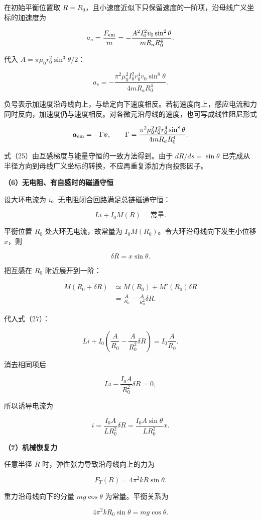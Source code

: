 \documentclass[12pt,a4paper,UTF8]{ctexart}
\begin{document}
在初始平衡位置取
\(R=R_0\)，且小速度近似下只保留速度的一阶项，沿母线广义坐标的加速度为

\[a_s=\frac{F_{\rm em}}m
=-\frac{A^2I_0^2v_0\sin^2\theta}{mR_aR_0^4}.\]

代入 \(A=\pi\mu_0r_0^2\sin^3\theta/2\)：

\[\boxed{
a_s=-\frac{\pi^2\mu_0^2I_0^2r_0^4v_0\sin^8\theta}
{4mR_aR_0^4}}.\]

负号表示加速度沿母线向上，与给定向下速度相反。若初速度向上，感应电流和力同时反向，加速度仍与速度相反。对各微元沿母线的速度，也可写成线性阻尼形式

\[\bm a_{\rm em}=-\Gamma\bm v,
\qquad
\Gamma=\frac{\pi^2\mu_0^2I_0^2r_0^4\sin^8\theta}
{4mR_aR_0^4}.\]

式（25）由互感梯度与能量守恒的一致方法得到。由于 \(dR/ds=\sin\theta\)
已完成从半径方向到母线广义坐标的转换，不应再重复添加方向投影因子。

\textbf{（6）无电阻、有自感时的磁通守恒}

设大环电流为 \(i\)。无电阻闭合回路满足总链磁通守恒：

\[Li+I_0M(R)=\text{常量}.\]

平衡位置 \(R_0\) 处大环无电流，故常量为
\(I_0M(R_0)\)。令大环沿母线向下发生小位移 \(x\)，则

\[\delta R=x\sin\theta.\]

把互感在 \(R_0\) 附近展开到一阶：

\[\begin{aligned}
M(R_0+\delta R)
&\simeq M(R_0)+M'(R_0)\delta R\\
&=\frac{A}{R_0}-\frac{A}{R_0^2}\delta R.
\end{aligned}\]

代入式（27）：

\[Li+I_0\left(\frac{A}{R_0}-\frac{A}{R_0^2}\delta R\right)
=I_0\frac{A}{R_0}.\]

消去相同项后

\[Li-\frac{I_0A}{R_0^2}\delta R=0,\]

所以诱导电流为

\[i=\frac{I_0A}{LR_0^2}\delta R
=\frac{I_0A\sin\theta}{LR_0^2}x.\]

\textbf{（7）机械恢复力}

任意半径 \(R\) 时，弹性张力导致沿母线向上的力为

\[F_T(R)=4\pi^2kR\sin\theta.\]

重力沿母线向下的分量 \(mg\cos\theta\) 为常量。平衡关系为

\[4\pi^2kR_0\sin\theta=mg\cos\theta.\]
\end{document}

